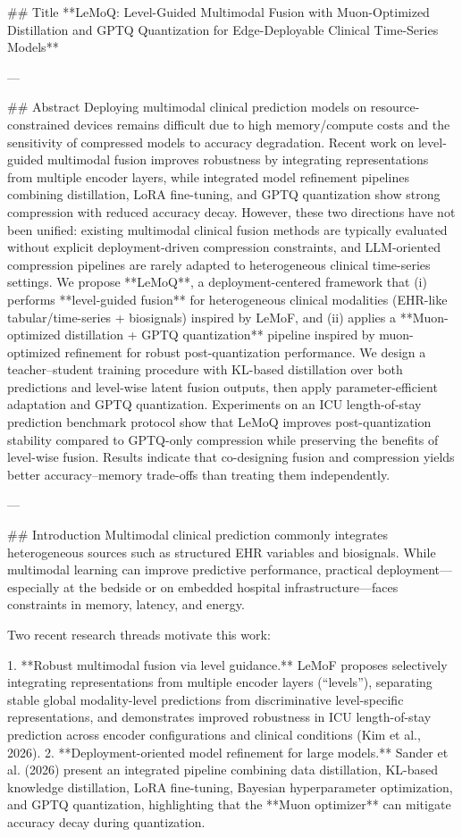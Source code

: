 ## Title  
**LeMoQ: Level-Guided Multimodal Fusion with Muon-Optimized Distillation and GPTQ Quantization for Edge-Deployable Clinical Time-Series Models**

---

## Abstract  
Deploying multimodal clinical prediction models on resource-constrained devices remains difficult due to high memory/compute costs and the sensitivity of compressed models to accuracy degradation. Recent work on level-guided multimodal fusion improves robustness by integrating representations from multiple encoder layers, while integrated model refinement pipelines combining distillation, LoRA fine-tuning, and GPTQ quantization show strong compression with reduced accuracy decay. However, these two directions have not been unified: existing multimodal clinical fusion methods are typically evaluated without explicit deployment-driven compression constraints, and LLM-oriented compression pipelines are rarely adapted to heterogeneous clinical time-series settings. We propose **LeMoQ**, a deployment-centered framework that (i) performs **level-guided fusion** for heterogeneous clinical modalities (EHR-like tabular/time-series + biosignals) inspired by LeMoF, and (ii) applies a **Muon-optimized distillation + GPTQ quantization** pipeline inspired by muon-optimized refinement for robust post-quantization performance. We design a teacher–student training procedure with KL-based distillation over both predictions and level-wise latent fusion outputs, then apply parameter-efficient adaptation and GPTQ quantization. Experiments on an ICU length-of-stay prediction benchmark protocol show that LeMoQ improves post-quantization stability compared to GPTQ-only compression while preserving the benefits of level-wise fusion. Results indicate that co-designing fusion and compression yields better accuracy–memory trade-offs than treating them independently.

---

## Introduction  
Multimodal clinical prediction commonly integrates heterogeneous sources such as structured EHR variables and biosignals. While multimodal learning can improve predictive performance, practical deployment—especially at the bedside or on embedded hospital infrastructure—faces constraints in memory, latency, and energy.

Two recent research threads motivate this work:

1. **Robust multimodal fusion via level guidance.** LeMoF proposes selectively integrating representations from multiple encoder layers (“levels”), separating stable global modality-level predictions from discriminative level-specific representations, and demonstrates improved robustness in ICU length-of-stay prediction across encoder configurations and clinical conditions (Kim et al., 2026).  
2. **Deployment-oriented model refinement for large models.** Sander et al. (2026) present an integrated pipeline combining data distillation, KL-based knowledge distillation, LoRA fine-tuning, Bayesian hyperparameter optimization, and GPTQ quantization, highlighting that the **Muon optimizer** can mitigate accuracy decay during quantization.

